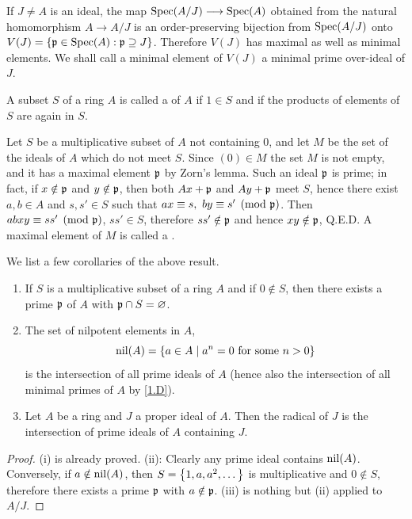 \documentclass[../main]{subfiles}
\begin{document}
If $J\ne A$ is an ideal, the map $\operatorname{Spec}(A/J)\longrightarrow\operatorname{Spec}(A)$ obtained from the natural homomorphism $A\longrightarrow A/J$ is an order-preserving bijection from $\operatorname{Spec}(A/J)$ onto $V(J)=\left\{\mathfrak{p}\in\operatorname{Spec}(A): \mathfrak{p}\supseteq J\right\}$. Therefore $V(J)$ has maximal as well as minimal elements. We shall call a minimal element of $V(J)$ a minimal prime over-ideal of $J$.

\newparagraph
A subset $S$ of a ring $A$ is called a  of $A$ if $1\in S$ and if the products of elements of $S$ are again in $S$.

Let $S$ be a multiplicative subset of $A$ not containing 0, and let $M$ be the set of the ideals of $A$ which do not meet $S$. Since $(0)\in M$ the set $M$ is not empty, and it has a maximal element $\mathfrak{p}$ by Zorn's lemma. Such an ideal $\mathfrak{p}$ is prime; in fact, if $x\notin\mathfrak{p}$ and $y\notin\mathfrak{p}$, then both $Ax+\mathfrak{p}$ and $Ay+\mathfrak{p}$ meet $S$, hence there exist $a,b\in A$ and $s,s'\in S$ such that $ax\equiv s,~by\equiv s'\pmod{\mathfrak{p}}$. Then $abxy\equiv ss'\pmod{\mathfrak{p}}$, $ss'\in S$, therefore $ss'\notin\mathfrak{p}$ and hence $xy\notin\mathfrak{p}$, Q.E.D. A maximal element of $M$ is called a .

We list a few corollaries of the above result.
\begin{enumerate}[label=(\roman*)]

    \item If $S$ is a multiplicative subset of a ring $A$ and if $0\notin S$, then there exists a prime $\mathfrak{p}$ of $A$ with $\mathfrak{p}\cap S=\varnothing$.
    
    \item The set of nilpotent elements in $A$,\label{sym:nil} \[\operatorname{nil}(A) = \left\{a\in A \mid a^n=0 \text{ for some }n>0\right\}\] is the intersection of all prime ideals of $A$ (hence also the intersection of all minimal primes of $A$ by \ref{1.D}).
    
    \item Let $A$ be a ring and $J$ a proper ideal of $A$. Then the radical of $J$ is the intersection of prime ideals of $A$ containing $J$.
    
\end{enumerate}

\begin{proof}
(i) is already proved. (ii): Clearly any prime ideal contains $\operatorname{nil}(A)$. Conversely, if $a\notin\operatorname{nil}(A)$, then $S=\left\{1,a,a^2,\dots\right\}$ is multiplicative and $0\notin S$, therefore there exists a prime $\mathfrak{p}$ with $a\notin\mathfrak{p}$. (iii) is nothing but (ii) applied to $A/J$.
\end{proof}
\end{document}
